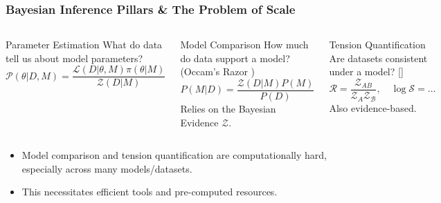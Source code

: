 \documentclass[aspectratio=169]{beamer}
\begin{document}
\begin{frame}
    \frametitle{Bayesian Inference Pillars \& The Problem of Scale}
    \begin{columns}[T]
        \begin{block}{Parameter Estimation}
            What do data tell us about model parameters?
            \[ \mathcal{P}(\theta|D,M) = \frac{\mathcal{L}(D|\theta,M) \pi(\theta|M)}{\mathcal{Z}(D|M)} \]
        \end{block}
        \begin{block}{Model Comparison}
            How much do data support a model? (Occam's Razor )
            \[ P(M|D) = \frac{\mathcal{Z}(D|M) P(M)}{P(D)} \]
            Relies on the Bayesian Evidence $\mathcal{Z}$.
        \end{block}
        \begin{block}{Tension Quantification}
            Are datasets consistent under a model? []
            \[ \mathcal{R} = \frac{\mathcal{Z}_{AB}}{\mathcal{Z}_A\mathcal{Z}_\mathcal{B}}, \quad \log \mathcal{S} = \dots  \]
            Also evidence-based.
        \end{block}
    \end{columns}
    \vfill
    \begin{itemize}
        \item Model comparison and tension quantification are computationally hard, especially across many models/datasets.
        \item This necessitates efficient tools and pre-computed resources.
    \end{itemize}
\end{frame}
\end{document}
